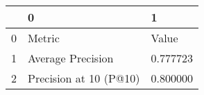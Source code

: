 \begin{tabular}{lll}
\toprule
 & 0 & 1 \\
\midrule
0 & Metric & Value \\
1 & Average Precision & 0.777723 \\
2 & Precision at 10 (P@10) & 0.800000 \\
\bottomrule
\end{tabular}
